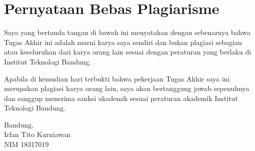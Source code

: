 \clearpage
\chapter*{Pernyataan Bebas Plagiarisme}

Saya yang bertanda tangan di bawah ini menyatakan dengan sebenarnya bahwa Tugas Akhir ini adalah murni karya saya sendiri dan bukan plagiasi sebagian atau keseluruhan dari karya orang lain sesuai dengan peraturan yang berlaku di Institut Teknologi Bandung.

Apabila di kemudian hari terbukti bahwa pekerjaan Tugas Akhir saya ini merupakan plagiasi karya orang lain, saya akan bertanggung jawab sepenuhnya dan sanggup menerima sanksi akademik sesuai peraturan akademik Institut Teknologi Bandung.
\\[\baselineskip]

\hfill
\parbox{5.5cm}{
	Bandung, \thedate \\[2\baselineskip]
	Irfan Tito Kurniawan \\
	NIM 18317019
}


